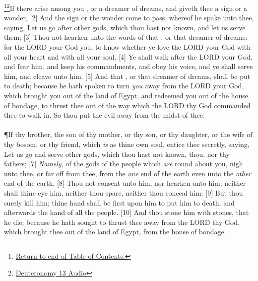 \footnote{\textcolor[cmyk]{0.99998,1,0,0}{\hyperlink{TOC}{Return to end of Table of Contents.}}}\footnote{\href{https://audiobible.com/bible/deuteronomy_13.html}{\textcolor[cmyk]{0.99998,1,0,0}{Deuteronomy 13 Audio}}}\textcolor[cmyk]{0.99998,1,0,0}{If there arise among you , or a dreamer of dreams, and giveth thee a sign or a wonder,}
[2] \textcolor[cmyk]{0.99998,1,0,0}{And the sign or the wonder come to pass, whereof he spake unto thee, saying, Let us go after other gods, which thou hast not known, and let us serve them;}
[3] \textcolor[cmyk]{0.99998,1,0,0}{Thou  not hearken unto the words of that , or that dreamer of dreams: for the LORD your God  you, to know whether ye love the LORD your God with all your heart and with all your soul.}
[4] \textcolor[cmyk]{0.99998,1,0,0}{Ye shall walk after the LORD your God, and fear him, and keep his commandments, and obey his voice, and ye shall serve him, and cleave unto him.}
[5] \textcolor[cmyk]{0.99998,1,0,0}{And that , or that dreamer of dreams, shall be put to death; because he hath spoken to turn \emph{you} away from the LORD your God, which brought you out of the land of Egypt, and redeemed you out of the house of bondage, to thrust thee out of the way which the LORD thy God commanded thee to walk in. So  thou put the evil away from the midst of thee.}\\
\\
\P \textcolor[cmyk]{0.99998,1,0,0}{If thy brother, the son of thy mother, or thy son, or thy daughter, or the wife of thy bosom, or thy friend, which \emph{is} as thine own soul, entice thee secretly, saying, Let us go and serve other gods, which thou hast not known, thou, nor thy fathers;}
[7] \textcolor[cmyk]{0.99998,1,0,0}{\emph{Namely}, of the gods of the people which \emph{are} round about you, nigh unto thee, or far off from thee, from the \emph{one} end of the earth even unto the \emph{other} end of the earth;}
[8] \textcolor[cmyk]{0.99998,1,0,0}{Thou  not consent unto him, nor hearken unto him; neither shall thine eye  him, neither  thou spare, neither  thou conceal him:}
[9] \textcolor[cmyk]{0.99998,1,0,0}{But thou  surely kill him; thine hand shall be first upon him to put him to death, and afterwards the hand of all the people.}
[10] \textcolor[cmyk]{0.99998,1,0,0}{And thou  stone him with stones, that he die; because he hath sought to thrust thee away from the LORD thy God, which brought thee out of the land of Egypt, from the house of bondage.}
